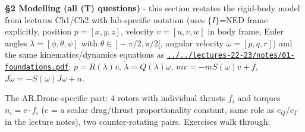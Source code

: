\documentclass[11pt]{article}
\begin{document}
\textbf{§2 Modelling (all (T) questions)} - this section restates the rigid-body model from lectures Ch1/Ch2 with lab-specific notation (uses $\{I\}$=NED frame explicitly, position $p=[x,y,z]$, velocity $v=[u,v,w]$ in body frame, Euler angles $\lambda=[\phi,\theta,\psi]$ with $\theta\in\,]-\pi/2,\pi/2[$, angular velocity $\omega=[p,q,r]$) and the same kinematics/dynamics equations as \href{../../lectures-22-23/notes/01-foundations.pdf}{\texttt{../../lectures-22-23/notes/01-\allowbreak{}foundations.pdf}}:
$\dot p=R(\lambda)v$, $\dot\lambda=Q(\lambda)\omega$, $m\dot v=-mS(\omega)v+f$, $J\dot\omega=-S(\omega)J\omega+n$.

The AR.Drone-specific part: 4 rotors with individual thrusts $f_i$ and torques $n_i=c\cdot f_i$ (c = a scalar drag/thrust proportionality constant, same role as $c_Q/c_T$ in the lecture notes), two counter-rotating pairs. Exercises walk through:
\end{document}
